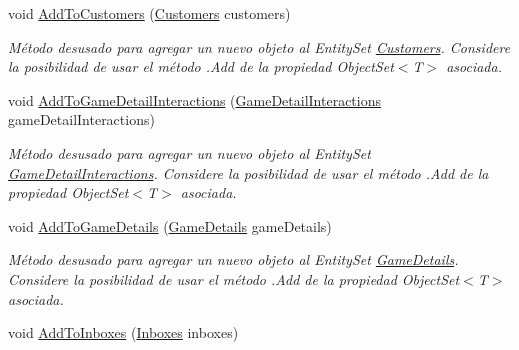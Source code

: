 \begin{DoxyCompactItemize}
void \hyperlink{class_microsoft_1_1_samples_1_1_kinect_1_1_basic_interactions_1_1_o_m_k_t_d_b_entities_a23b2a57bbd4e015a9431c58e6cd80158}{Add\-To\-Customers} (\hyperlink{class_microsoft_1_1_samples_1_1_kinect_1_1_basic_interactions_1_1_customers}{Customers} customers)
\begin{DoxyCompactList}\small\item\em Método desusado para agregar un nuevo objeto al Entity\-Set \hyperlink{class_microsoft_1_1_samples_1_1_kinect_1_1_basic_interactions_1_1_customers}{Customers}. Considere la posibilidad de usar el método .Add de la propiedad Object\-Set$<$T$>$ asociada. \end{DoxyCompactList}\item 
void \hyperlink{class_microsoft_1_1_samples_1_1_kinect_1_1_basic_interactions_1_1_o_m_k_t_d_b_entities_af45fe65b204976176c69a1db39948163}{Add\-To\-Game\-Detail\-Interactions} (\hyperlink{class_microsoft_1_1_samples_1_1_kinect_1_1_basic_interactions_1_1_game_detail_interactions}{Game\-Detail\-Interactions} game\-Detail\-Interactions)
\begin{DoxyCompactList}\small\item\em Método desusado para agregar un nuevo objeto al Entity\-Set \hyperlink{class_microsoft_1_1_samples_1_1_kinect_1_1_basic_interactions_1_1_game_detail_interactions}{Game\-Detail\-Interactions}. Considere la posibilidad de usar el método .Add de la propiedad Object\-Set$<$T$>$ asociada. \end{DoxyCompactList}\item 
void \hyperlink{class_microsoft_1_1_samples_1_1_kinect_1_1_basic_interactions_1_1_o_m_k_t_d_b_entities_afe88f30965a4b2c17763fb825d3d24e4}{Add\-To\-Game\-Details} (\hyperlink{class_microsoft_1_1_samples_1_1_kinect_1_1_basic_interactions_1_1_game_details}{Game\-Details} game\-Details)
\begin{DoxyCompactList}\small\item\em Método desusado para agregar un nuevo objeto al Entity\-Set \hyperlink{class_microsoft_1_1_samples_1_1_kinect_1_1_basic_interactions_1_1_game_details}{Game\-Details}. Considere la posibilidad de usar el método .Add de la propiedad Object\-Set$<$T$>$ asociada. \end{DoxyCompactList}\item 
void \hyperlink{class_microsoft_1_1_samples_1_1_kinect_1_1_basic_interactions_1_1_o_m_k_t_d_b_entities_ae4e57ed4df1dae8ca31ca5ed1e84ffd4}{Add\-To\-Inboxes} (\hyperlink{class_microsoft_1_1_samples_1_1_kinect_1_1_basic_interactions_1_1_inboxes}{Inboxes} inboxes)

\end{DoxyCompactItemize}
